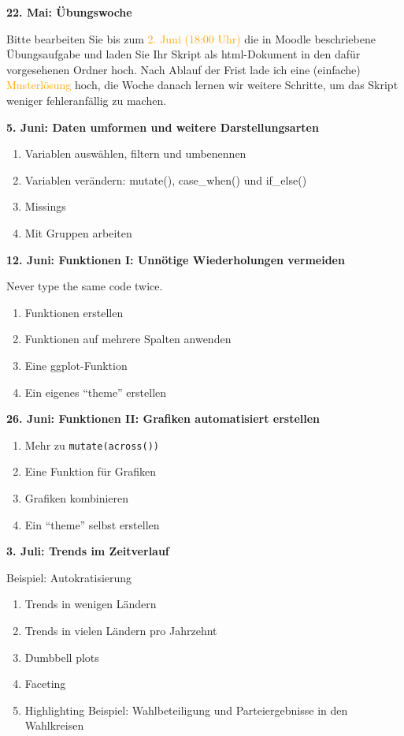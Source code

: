 \documentclass[11pt,]{scrartcl}
\providecommand{\tightlist}{%
   \setlength{\itemsep}{0pt}\setlength{\parskip}{0pt}}
\begin{document}
\textbf{22. Mai: Übungswoche}

Bitte bearbeiten Sie bis zum \textcolor{Orange}{2. Juni (18:00 Uhr)} die
in Moodle beschriebene Übungsaufgabe und laden Sie Ihr Skript als
html-Dokument in den dafür vorgesehenen Ordner hoch. Nach Ablauf der
Frist lade ich eine (einfache) \textcolor{Orange}{Musterlösung} hoch,
die Woche danach lernen wir weitere Schritte, um das Skript weniger
fehleranfällig zu machen.

\textbf{5. Juni: Daten umformen und weitere Darstellungsarten}

\begin{enumerate}
\def\labelenumi{\alph{enumi})}
\tightlist
\item
  Variablen auswählen, filtern und umbenennen
\item
  Variablen verändern: mutate(), case\_when() und if\_else()
\item
  Missings
\item
  Mit Gruppen arbeiten
\end{enumerate}

\textbf{12. Juni: Funktionen I: Unnötige Wiederholungen vermeiden}

Never type the same code twice.

\begin{enumerate}
\def\labelenumi{\alph{enumi})}
\tightlist
\item
  Funktionen erstellen
\item
  Funktionen auf mehrere Spalten anwenden
\item
  Eine ggplot-Funktion
\item
  Ein eigenes ``theme'' erstellen
\end{enumerate}

\textbf{26. Juni: Funktionen II: Grafiken automatisiert erstellen}

\begin{enumerate}
\def\labelenumi{\alph{enumi})}
\tightlist
\item
  Mehr zu \texttt{mutate(across())}
\item
  Eine Funktion für Grafiken
\item
  Grafiken kombinieren
\item
  Ein ``theme'' selbst erstellen
\end{enumerate}

\textbf{3. Juli: Trends im Zeitverlauf}

Beispiel: Autokratisierung

\begin{enumerate}
\def\labelenumi{\alph{enumi})}
\tightlist
\item
  Trends in wenigen Ländern
\item
  Trends in vielen Ländern pro Jahrzehnt
\item
  Dumbbell plots
\item
  Faceting
\item
  Highlighting Beispiel: Wahlbeteiligung und Parteiergebnisse in den
  Wahlkreisen
\end{enumerate}
\end{document}
